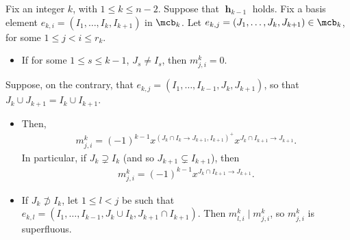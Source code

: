 \begin{lemma}\label{superfluous}
Fix an integer $k$, with $1\leq k\leq n-2$. Suppose that $\mbfh_{k-1}$
holds. Fix a basis element $e_{k,i}=(I_1,\ldots ,I_k,I_{k+1})$ in
$\mcb_k$. Let $e_{k,j}=(J_1,\ldots ,J_k,J_{k+1})\in\mcb_k$, for some
$1\leq j<i\leq r_k$.
\begin{itemize}
\item[$(a)$] If for some $1\leq s\leq k-1$, $J_s\neq I_s$, then
  $m^k_{j,i}=0$. 
\end{itemize}
Suppose, on the contrary, that $e_{k,j}=(I_1,\ldots
,I_{k-1},J_{k},J_{k+1})$, so that $J_k\cup J_{k+1}=I_{k}\cup I_{k+1}$.
\begin{itemize}
\item[$(b)$] Then, 
\begin{eqnarray*}
m^k_{j,i} =(-1)^{k-1}x^{(J_k\cap I_k\to J_{k+1},I_{k+1})^+}x^{J_k\cap
  I_{k+1}\to J_{k+1}}.
\end{eqnarray*}
 In particular, if $J_k\supsetneq I_k$ (and so $J_{k+1}\subsetneq
 I_{k+1}$), then
\begin{eqnarray}\label{mji}
m^k_{j,i}=(-1)^{k-1}x^{J_{k}\cap I_{k+1}\to J_{k+1}}.
\end{eqnarray}
\item[$(c)$] If $J_k\not\supset I_k$, let $1\leq l<j$ be such that
  $e_{k,l}=(I_1,\ldots ,I_{k-1},J_{k}\cup I_k,J_{k+1}\cap
  I_{k+1})$. Then $m^k_{l,i}\mid m^k_{j,i}$, so $m^k_{j,i}$ is
  superfluous.
\end{itemize}
\end{lemma}
